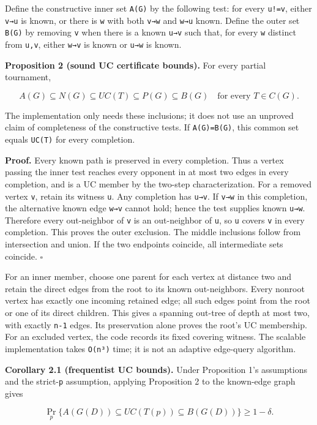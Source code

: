 \documentclass[
  11pt,
]{article}
\begin{document}
Define the constructive inner set \texttt{A(G)} by the following test:
for every \texttt{u!=v}, either \texttt{v→u} is known, or there is
\texttt{w} with both \texttt{v→w} and \texttt{w→u} known. Define the
outer set \texttt{B(G)} by removing \texttt{v} when there is a known
\texttt{u→v} such that, for every \texttt{w} distinct from \texttt{u,v},
either \texttt{w→v} is known or \texttt{u→w} is known.

\textbf{Proposition 2 (sound UC certificate bounds).} For every partial
tournament,

\[
A(G)\subseteq N(G)\subseteq UC(T)\subseteq P(G)\subseteq B(G)
\quad\text{for every }T\in C(G).
\]

The implementation only needs these inclusions; it does not use an
unproved claim of completeness of the constructive tests. If
\texttt{A(G)=B(G)}, this common set equals \texttt{UC(T)} for every
completion.

\textbf{Proof.} Every known path is preserved in every completion. Thus
a vertex passing the inner test reaches every opponent in at most two
edges in every completion, and is a UC member by the two-step
characterization. For a removed vertex \texttt{v}, retain its witness
\texttt{u}. Any completion has \texttt{u→v}. If \texttt{v→w} in this
completion, the alternative known edge \texttt{w→v} cannot hold; hence
the test supplies known \texttt{u→w}. Therefore every out-neighbor of
\texttt{v} is an out-neighbor of \texttt{u}, so \texttt{u} covers
\texttt{v} in every completion. This proves the outer exclusion. The
middle inclusions follow from intersection and union. If the two
endpoints coincide, all intermediate sets coincide. \(\square\)

For an inner member, choose one parent for each vertex at distance two
and retain the direct edges from the root to its known out-neighbors.
Every nonroot vertex has exactly one incoming retained edge; all such
edges point from the root or one of its direct children. This gives a
spanning out-tree of depth at most two, with exactly \texttt{n-1} edges.
Its preservation alone proves the root's UC membership. For an excluded
vertex, the code records its fixed covering witness. The scalable
implementation takes \texttt{O(n³)} time; it is not an adaptive
edge-query algorithm.

\textbf{Corollary 2.1 (frequentist UC bounds).} Under Proposition 1's
assumptions and the strict-\texttt{p} assumption, applying Proposition 2
to the known-edge graph gives

\[
\Pr_p\{A(G(D))\subseteq UC(T(p))\subseteq B(G(D))\}\ge1-\delta.
\]
\end{document}
